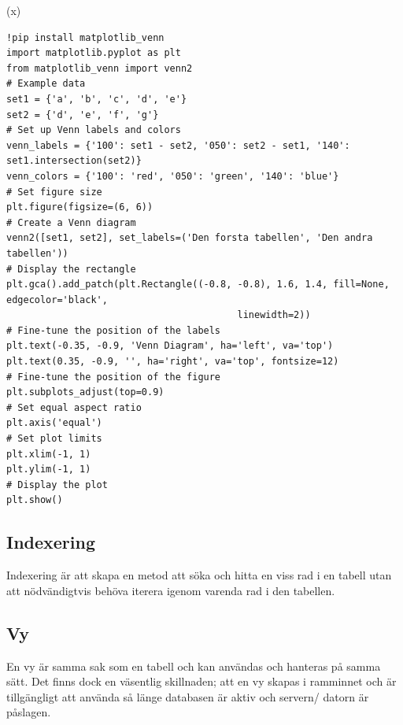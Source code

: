 \documentclass[]{article}
\begin{document}
\if(x)
\begin{lstlisting}
!pip install matplotlib_venn
import matplotlib.pyplot as plt
from matplotlib_venn import venn2
# Example data
set1 = {'a', 'b', 'c', 'd', 'e'}
set2 = {'d', 'e', 'f', 'g'}
# Set up Venn labels and colors
venn_labels = {'100': set1 - set2, '050': set2 - set1, '140': set1.intersection(set2)}
venn_colors = {'100': 'red', '050': 'green', '140': 'blue'}
# Set figure size
plt.figure(figsize=(6, 6))
# Create a Venn diagram
venn2([set1, set2], set_labels=('Den forsta tabellen', 'Den andra tabellen'))
# Display the rectangle
plt.gca().add_patch(plt.Rectangle((-0.8, -0.8), 1.6, 1.4, fill=None, edgecolor='black', 
								   	     linewidth=2))
# Fine-tune the position of the labels
plt.text(-0.35, -0.9, 'Venn Diagram', ha='left', va='top')
plt.text(0.35, -0.9, '', ha='right', va='top', fontsize=12)
# Fine-tune the position of the figure
plt.subplots_adjust(top=0.9)
# Set equal aspect ratio
plt.axis('equal')
# Set plot limits
plt.xlim(-1, 1)
plt.ylim(-1, 1)
# Display the plot
plt.show()
\end{lstlisting}
\fi
\subsection{Indexering}

Indexering är att skapa en metod att söka och hitta en viss rad i en tabell utan att nödvändigtvis behöva iterera igenom varenda rad i den tabellen.



\subsection{Vy}

En vy är samma sak som en tabell och kan användas och hanteras på samma sätt. Det finns dock en väsentlig skillnaden; att en vy skapas i ramminnet och är tillgängligt att använda så länge databasen är aktiv och servern/ datorn är påslagen.
\end{document}
